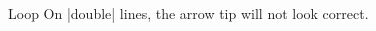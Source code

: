 \begin{multicols}{2}
\begin{arrowtip}{Loop}
    On |double| lines, the arrow tip will not look correct.
\end{arrowtip}
\end{multicols}
\tikzset{external/export/.try=true}%
\endinput
